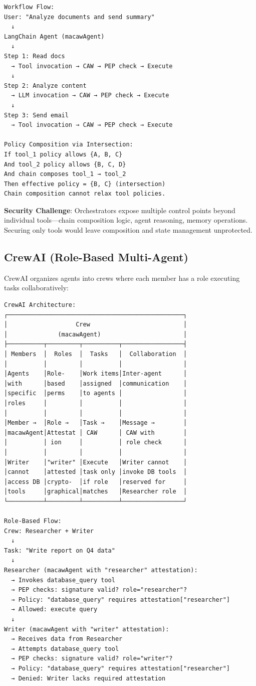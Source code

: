 {{\begin{verbatim}
Workflow Flow:
User: "Analyze documents and send summary"
  ↓
LangChain Agent (macawAgent)
  ↓
Step 1: Read docs
  → Tool invocation → CAW → PEP check → Execute
  ↓
Step 2: Analyze content
  → LLM invocation → CAW → PEP check → Execute
  ↓
Step 3: Send email
  → Tool invocation → CAW → PEP check → Execute

Policy Composition via Intersection:
If tool_1 policy allows {A, B, C}
And tool_2 policy allows {B, C, D}
And chain composes tool_1 → tool_2
Then effective policy = {B, C} (intersection)
Chain composition cannot relax tool policies.
\end{verbatim}}

\textbf{Security Challenge}: Orchestrators expose multiple control points beyond individual tools—chain composition logic, agent reasoning, memory operations. Securing only tools would leave composition and state management unprotected.

\subsection*{CrewAI (Role-Based Multi-Agent)}

CrewAI organizes agents into crews where each member has a role executing tasks collaboratively:

{\tiny
\begin{verbatim}
CrewAI Architecture:
┌─────────────────────────────────────────────────┐
│                   Crew                          │
│              (macawAgent)                       │
├──────────┬─────────┬──────────┬─────────────────┤
│ Members  │  Roles  │  Tasks   │  Collaboration  │
│          │         │          │                 │
│Agents    │Role-    │Work items│Inter-agent      │
│with      │based    │assigned  │communication    │
│specific  │perms    │to agents │                 │
│roles     │         │          │                 │
│          │         │          │                 │
│Member →  │Role →   │Task →    │Message →        │
│macawAgent│Attestat │ CAW      │ CAW with        │
│          │ ion     │          │ role check      │
│          │         │          │                 │
│Writer    │"writer" │Execute   │Writer cannot    │
│cannot    │attested │task only │invoke DB tools  │
│access DB │crypto-  │if role   │reserved for     │
│tools     │graphical│matches   │Researcher role  │
└──────────┴─────────┴──────────┴─────────────────┘

Role-Based Flow:
Crew: Researcher + Writer
  ↓
Task: "Write report on Q4 data"
  ↓
Researcher (macawAgent with "researcher" attestation):
  → Invokes database_query tool
  → PEP checks: signature valid? role="researcher"?
  → Policy: "database_query" requires attestation["researcher"]
  → Allowed: execute query
  ↓
Writer (macawAgent with "writer" attestation):
  → Receives data from Researcher
  → Attempts database_query tool
  → PEP checks: signature valid? role="writer"?
  → Policy: "database_query" requires attestation["researcher"]
  → Denied: Writer lacks required attestation
\end{verbatim}}

}
